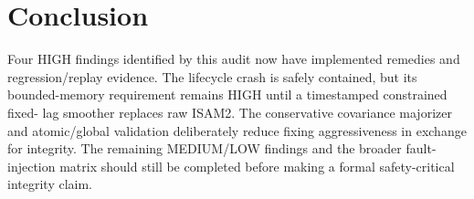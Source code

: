 \documentclass[11pt,a4paper]{article}
\begin{document}
\section{Conclusion}

Four HIGH findings identified by this audit now have implemented remedies and
regression/replay evidence.  The lifecycle crash is safely contained, but its
bounded-memory requirement remains HIGH until a timestamped constrained fixed-
lag smoother replaces raw ISAM2.  The conservative covariance majorizer and
atomic/global validation deliberately reduce fixing aggressiveness in exchange
for integrity.  The remaining MEDIUM/LOW findings and the broader fault-
injection matrix should still be completed before making a formal
safety-critical integrity claim.
\end{document}
